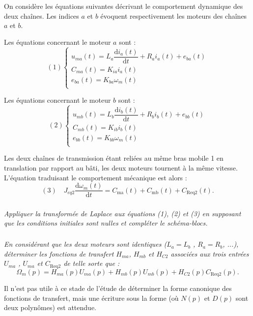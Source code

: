 \documentclass[10pt,fleqn]{article} %
\begin{document}
On considère les équations suivantes décrivant le comportement dynamique  des deux chaînes. Les indices $a$ et $b$ évoquent respectivement les moteurs des chaînes $a$ et $b$.

\noindent
\begin{minipage}{.48\linewidth}
Les équations concernant le moteur $a$ sont :
$$  (1) \left\{
\begin{array}{l}
u_{ma}(t)=L_a\dfrac{\text{d}i_a(t)}{\text{d}t}+R_ai_a(t)+e_{ba}(t) \\

C_{ma}(t)=K_{ia} i_a(t) \\

e_{ba}(t)=K_{ba} \omega_m(t) \\
\end{array}
\right.
$$
\end{minipage} \hfill
\begin{minipage}{.48\linewidth}
Les équations concernant le moteur $b$ sont :
$$ (2) \left\{
\begin{array}{l}
u_{mb}(t)=L_b\dfrac{\text{d}i_b(t)}{\text{d}t}+R_bi_b(t)+e_{bb}(t) \\

C_{mb}(t)=K_{ib} i_b(t) \\

e_{bb}(t)=K_{bb} \omega_m(t) \\
\end{array}
\right.
$$

\end{minipage}

Les deux chaînes de transmission étant reliées au même bras mobile 1 en translation par rapport au bâti, les deux moteurs tournent à la même vitesse. L’équation traduisant le comportement mécanique est alors :
$$
(3)  \quad
J_{eq2}\dfrac{\text{d}\omega_m(t)}{\text{d} t}=C_{\text{ma}}(t)+C_{\text{mb}}(t)+C_{\text{Req2}}(t).
$$

\subparagraph{}\textit{Appliquer la transformée de Laplace aux équations (1), (2) et (3) en supposant que les conditions initiales sont nulles et compléter le schéma-blocs.}

\subparagraph{}
\textit{En considérant que les deux moteurs sont identiques ($L_a  = L_b$ , $R_a = R_b$, ...), déterminer les fonctions de transfert $H_{ma}$, $H_{mb}$ et $H_{C2}$ associées aux trois entrées $U_{ma}$ , $U_{ma}$ et $C_{\text{Req2}}$ de telle sorte que :}
$$\Omega_m (p) = H_{ma}(p) U_{ma}(p) + H_{mb} (p) U_{mb} (p) + H_{C2}(p) C_{\text{Req2}} (p).$$

Il n’est pas utile  à ce stade de l’étude de déterminer la forme canonique des fonctions de transfert, mais une écriture sous la forme (où $N(p)$ et $D(p)$ sont deux polynômes) est attendue.
\end{document}
